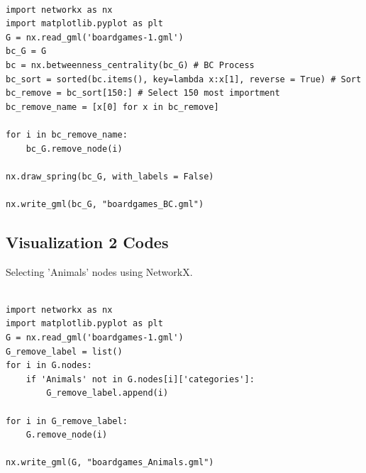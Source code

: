 \documentclass{article}
\begin{document}
\begin{lstlisting}

import networkx as nx
import matplotlib.pyplot as plt
G = nx.read_gml('boardgames-1.gml')
bc_G = G
bc = nx.betweenness_centrality(bc_G) # BC Process
bc_sort = sorted(bc.items(), key=lambda x:x[1], reverse = True) # Sort
bc_remove = bc_sort[150:] # Select 150 most importment
bc_remove_name = [x[0] for x in bc_remove]

for i in bc_remove_name:
    bc_G.remove_node(i)

nx.draw_spring(bc_G, with_labels = False)

nx.write_gml(bc_G, "boardgames_BC.gml")

\end{lstlisting}

\subsection{Visualization 2 Codes}

Selecting 'Animals' nodes using NetworkX.

\begin{lstlisting}

import networkx as nx
import matplotlib.pyplot as plt
G = nx.read_gml('boardgames-1.gml')
G_remove_label = list()
for i in G.nodes:
    if 'Animals' not in G.nodes[i]['categories']:
        G_remove_label.append(i)

for i in G_remove_label:
    G.remove_node(i)
    
nx.write_gml(G, "boardgames_Animals.gml")

\end{lstlisting}



\end{document}
